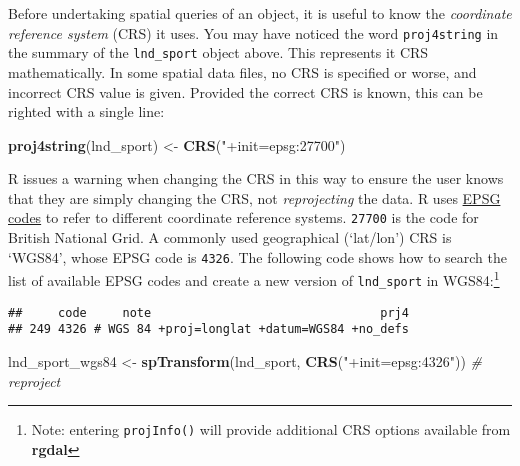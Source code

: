 \documentclass[]{article}
\newenvironment{Shaded}{}{}
\newcommand{\KeywordTok}[1]{\textcolor[rgb]{0.00,0.44,0.13}{\textbf{{#1}}}}
\newcommand{\StringTok}[1]{\textcolor[rgb]{0.25,0.44,0.63}{{#1}}}
\newcommand{\CommentTok}[1]{\textcolor[rgb]{0.38,0.63,0.69}{\textit{{#1}}}}
\newcommand{\NormalTok}[1]{{#1}}
\begin{document}
Before undertaking spatial queries of an object, it is useful to know
the \emph{coordinate reference system} (CRS) it uses. You may have
noticed the word \texttt{proj4string} in the summary of the
\texttt{lnd\_sport} object above. This represents it CRS mathematically.
In some spatial data files, no CRS is specified or worse, and incorrect
CRS value is given. Provided the correct CRS is known, this can be
righted with a single line:

\begin{Shaded}
\begin{Highlighting}[]
\KeywordTok{proj4string}\NormalTok{(lnd_sport) <-}\StringTok{ }\KeywordTok{CRS}\NormalTok{(}\StringTok{"+init=epsg:27700"}\NormalTok{)}
\end{Highlighting}
\end{Shaded}

R issues a warning when changing the CRS in this way to ensure the user
knows that they are simply changing the CRS, not \emph{reprojecting} the
data. R uses \href{}{EPSG codes} to refer to different coordinate
reference systems. \texttt{27700} is the code for British National Grid.
A commonly used geographical (`lat/lon') CRS is `WGS84', whose EPSG code
is \texttt{4326}. The following code shows how to search the list of
available EPSG codes and create a new version of \texttt{lnd\_sport} in
WGS84:\footnote{Note: entering \texttt{projInfo()} will provide
  additional CRS options available from \textbf{rgdal}}

\begin{Shaded}
\end{Shaded}

\begin{verbatim}
##     code     note                                prj4
## 249 4326 # WGS 84 +proj=longlat +datum=WGS84 +no_defs
\end{verbatim}

\begin{Shaded}
\begin{Highlighting}[]
\NormalTok{lnd_sport_wgs84 <-}\StringTok{ }\KeywordTok{spTransform}\NormalTok{(lnd_sport, }\KeywordTok{CRS}\NormalTok{(}\StringTok{"+init=epsg:4326"}\NormalTok{)) }\CommentTok{# reproject}
\end{Highlighting}
\end{Shaded}
\end{document}
